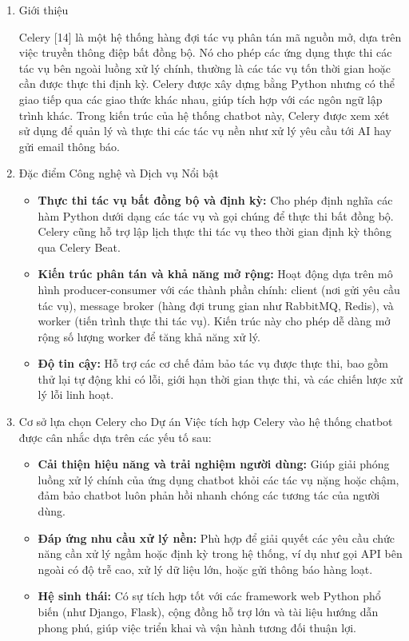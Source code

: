 \begin{enumerate}[label=\arabic*., font=\bfseries]
    \item Giới thiệu

    Celery [14] là một hệ thống hàng đợi tác vụ phân tán mã nguồn mở, dựa trên việc truyền thông điệp bất đồng bộ. Nó cho phép các ứng dụng thực thi các tác vụ bên ngoài luồng xử lý chính, thường là các tác vụ tốn thời gian hoặc cần được thực thi định kỳ. Celery được xây dựng bằng Python nhưng có thể giao tiếp qua các giao thức khác nhau, giúp tích hợp với các ngôn ngữ lập trình khác. Trong kiến trúc của hệ thống chatbot này, Celery được xem xét sử dụng để quản lý và thực thi các tác vụ nền như xử lý yêu cầu tới AI hay gửi email thông báo.

    \item Đặc điểm Công nghệ và Dịch vụ Nổi bật 
    \begin{itemize}
		\item \textbf{Thực thi tác vụ bất đồng bộ và định kỳ:} Cho phép định nghĩa các hàm Python dưới dạng các tác vụ và gọi chúng để thực thi bất đồng bộ. Celery cũng hỗ trợ lập lịch thực thi tác vụ theo thời gian định kỳ thông qua Celery Beat.
        \item \textbf{Kiến trúc phân tán và khả năng mở rộng:} Hoạt động dựa trên mô hình producer-consumer với các thành phần chính: client (nơi gửi yêu cầu tác vụ), message broker (hàng đợi trung gian như RabbitMQ, Redis), và worker (tiến trình thực thi tác vụ). Kiến trúc này cho phép dễ dàng mở rộng số lượng worker để tăng khả năng xử lý.
        \item \textbf{Độ tin cậy:} Hỗ trợ các cơ chế đảm bảo tác vụ được thực thi, bao gồm thử lại tự động khi có lỗi, giới hạn thời gian thực thi, và các chiến lược xử lý lỗi linh hoạt.
    \end{itemize}
	
    \item Cơ sở lựa chọn Celery cho Dự án
    Việc tích hợp Celery vào hệ thống chatbot được cân nhắc dựa trên các yếu tố sau:
    \begin{itemize}
        \item \textbf{Cải thiện hiệu năng và trải nghiệm người dùng:} Giúp giải phóng luồng xử lý chính của ứng dụng chatbot khỏi các tác vụ nặng hoặc chậm, đảm bảo chatbot luôn phản hồi nhanh chóng các tương tác của người dùng.
        \item \textbf{Đáp ứng nhu cầu xử lý nền:} Phù hợp để giải quyết các yêu cầu chức năng cần xử lý ngầm hoặc định kỳ trong hệ thống, ví dụ như gọi API bên ngoài có độ trễ cao, xử lý dữ liệu lớn, hoặc gửi thông báo hàng loạt.
        \item \textbf{Hệ sinh thái:} Có sự tích hợp tốt với các framework web Python phổ biến (như Django, Flask), cộng đồng hỗ trợ lớn và tài liệu hướng dẫn phong phú, giúp việc triển khai và vận hành tương đối thuận lợi.
    \end{itemize}
\end{enumerate}


